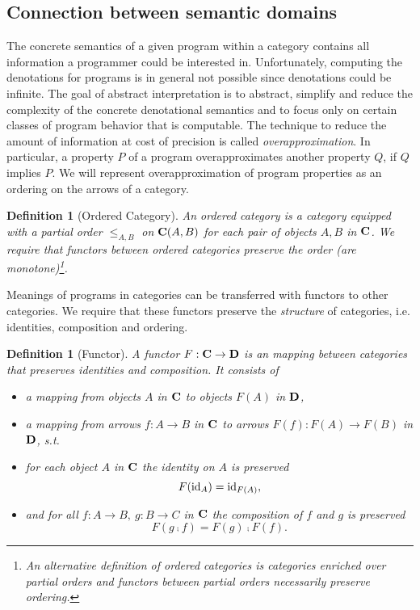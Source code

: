 \documentclass{article}
\newtheorem{definition}[theorem]{Definition}
\begin{document}
\subsection{Connection between semantic domains}

The concrete semantics of a given program within a category contains all information a programmer could be interested in. Unfortunately, computing the denotations for programs is in general not possible since denotations could be infinite. The goal of abstract interpretation is to abstract, simplify and reduce the complexity of the concrete denotational semantics and to focus only on certain classes of program behavior that is computable. The technique to reduce the amount of information at cost of precision is called \emph{overapproximation}. In particular, a property $P$ of a program overapproximates another property $Q$, if $Q$ implies $P$. We will represent overapproximation of program properties as an ordering on the arrows of a category.

\begin{definition}[Ordered Category] \normalfont
  An ordered category is a category equipped with a partial order $\leq_{A, B}$ on $\mathbf{C}(A,B)$ for each pair of objects $A,B$ in $\mathbf{C}$. We require that functors between ordered categories preserve the order (are monotone)\footnote{An alternative definition of ordered categories is categories enriched over partial orders and functors between partial orders necessarily preserve ordering.}.
\end{definition}

Meanings of programs in categories can be transferred with functors to other categories. We require that these functors preserve the \emph{structure} of categories, i.e. identities, composition and ordering.

\begin{definition}[Functor] \normalfont
  A \emph{functor} $F: \mathbf{C} \rightarrow \mathbf{D}$ is an mapping between categories that preserves identities and composition. It consists of
  \begin{itemize}
    \item a mapping from objects $A$ in $\mathbf{C}$ to objects $F(A)$ in $\mathbf{D}$,
    \item a mapping from arrows $f:A \rightarrow B$ in $\mathbf{C}$ to arrows $F(f):F(A) \rightarrow F(B)$ in $\mathbf{D}$, s.t.
    \item for each object $A$ in $\mathbf{C}$ the identity on $A$ is preserved \[ F(\operatorname{id}_A) = \operatorname{id}_{F(A)}, \]
    \item and for all $f:A \rightarrow B,\ g: B \rightarrow C$ in $\mathbf{C}$ the composition of $f$ and $g$ is preserved \[ F(g \comp f) = F(g) \comp F(f). \]
  \end{itemize}
\end{definition}
\end{document}
